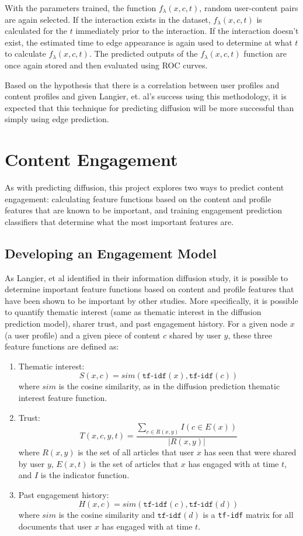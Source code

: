 With the parameters trained, the function $f_\lambda(x, c, t)$, random user-content pairs are again selected.  If the interaction exists in the dataset, $f_\lambda(x, c, t)$ is calculated for the $t$ immediately prior to the interaction.  If the interaction doesn't exist, the estimated time to edge appearance is again used to determine at what $t$ to calculate $f_\lambda(x, c, t)$.  The predicted outputs of the $f_\lambda(x, c, t)$ function are once again stored and then evaluated using ROC curves.

Based on the hypothesis that there is a correlation between user profiles and content profiles and given Langier, et. al's success using this methodology, it is expected that this technique for predicting diffusion will be more successful than simply using edge prediction.

\section{Content Engagement}\label{ch:methodsengagement}
As with predicting diffusion, this project explores two ways to predict content engagement: calculating feature functions based on the content and profile features that are known to be important, and training engagement prediction classifiers that determine what the most important features are.
\subsection{Developing an Engagement Model} \label{sec:engagementmodel}
As Langier, et al identified in their information diffusion study, it is possible to determine important feature functions based on content and profile features that have been shown to be important by other studies.  More specifically, it is possible to quantify thematic interest (same as thematic interest in the diffusion prediction model), sharer trust, and past engagement history.  For a given node $x$ (a user profile) and a given piece of content $c$ shared by user $y$, these three feature functions are defined as:
\begin{enumerate}
	\item Thematic interest: $$S(x, c) = sim(\texttt{tf-idf}(x), \texttt{tf-idf}(c))$$ where $sim$ is the cosine similarity, as in the diffusion prediction thematic interest feature function.
	\item Trust: $$T(x, c, y, t) = \frac{\sum_{c \in R(x,y)} I(c \in E(x))}{|R(x,y)|}$$ where $R(x,y)$ is the set of all articles that user $x$ has seen that were shared by user $y$, $E(x, t)$ is the set of articles that $x$ has engaged with at time $t$, and $I$ is the indicator function.
	\item Past engagement history: $$H(x, c) = sim(\texttt{tf-idf}(c), \texttt{tf-idf}(d))$$ where $sim$ is the cosine similarity and $\texttt{tf-idf}(d)$ is a \texttt{tf-idf} matrix for all documents that user $x$ has engaged with at time $t$.  
\end{enumerate}

